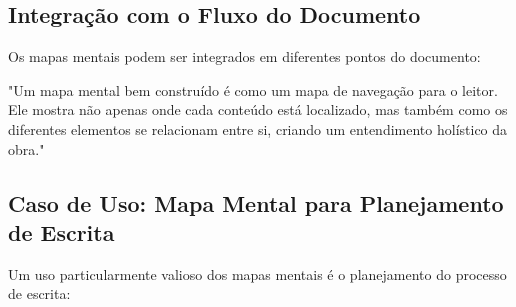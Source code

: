 
\subsection{Integração com o Fluxo do Documento}

Os mapas mentais podem ser integrados em diferentes pontos do documento:

\begin{itemize}
\end{itemize}

\begin{quotebox}
"Um mapa mental bem construído é como um mapa de navegação para o leitor. Ele mostra não apenas onde cada conteúdo está localizado, mas também como os diferentes elementos se relacionam entre si, criando um entendimento holístico da obra."
\end{quotebox}

\subsection{Caso de Uso: Mapa Mental para Planejamento de Escrita}

Um uso particularmente valioso dos mapas mentais é o planejamento do processo de escrita:

